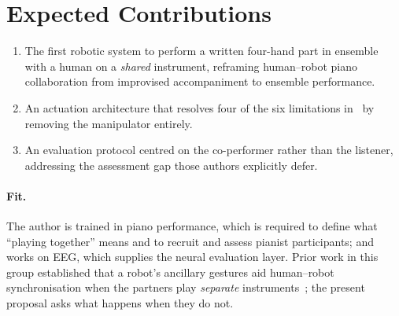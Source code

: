 \documentclass[11pt]{article}
\begin{document}
\section{Expected Contributions}
\begin{enumerate}[label=(\arabic*)]
  \item The first robotic system to perform a written four-hand part in ensemble with a human on a
        \emph{shared} instrument, reframing human--robot piano collaboration from improvised
        accompaniment to ensemble performance.
  \item An actuation architecture that resolves four of the six limitations
        in~\cite{wang2024cooperative} by removing the manipulator entirely.
  \item An evaluation protocol centred on the co-performer rather than the listener, addressing the
        assessment gap those authors explicitly defer.
\end{enumerate}

\paragraph{Fit.} The author is trained in piano performance, which is required to define what
``playing together'' means and to recruit and assess pianist participants; and works on EEG, which
supplies the neural evaluation layer. Prior work in this group established that a robot's ancillary
gestures aid human--robot synchronisation when the partners play \emph{separate}
instruments~\cite{musicbodymachine2024}; the present proposal asks what happens when they do not.



\end{document}
